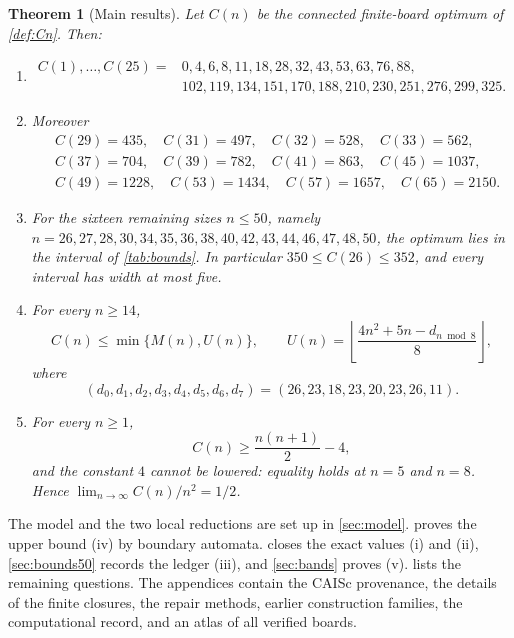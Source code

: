 \documentclass[10pt]{article}
\newtheorem{theorem}{Theorem}[section]
\theoremstyle{remark}
\begin{document}
\begin{theorem}[Main results]\label{thm:main}
Let $C(n)$ be the connected finite-board optimum of
\cref{def:Cn}.  Then:
\begin{enumerate}[label=\textup{(\roman*)}]
\item
\[
\begin{aligned}
C(1),\ldots,C(25)={}&0,4,6,8,11,18,28,32,43,53,63,76,88,\\
&102,119,134,151,170,188,210,230,251,276,299,325.
\end{aligned}
\]
\item Moreover
\[
\begin{aligned}
&C(29)=435,\quad C(31)=497,\quad C(32)=528,\quad C(33)=562,\\
&C(37)=704,\quad C(39)=782,\quad C(41)=863,\quad C(45)=1037,\\
&C(49)=1228,\quad C(53)=1434,\quad C(57)=1657,\quad C(65)=2150.
\end{aligned}
\]
\item For the sixteen remaining sizes $n\le50$, namely
$n=26,27,28,30,34,35,36,38,40,42,43,44,46,47,48,50$, the optimum lies in the
interval of \cref{tab:bounds}.  In particular $350\le C(26)\le352$, and every
interval has width at most five.
\item For every $n\ge14$,
\begin{equation}\label{eq:main-upper}
C(n)\le \min\{M(n),U(n)\},\qquad
U(n)=\left\lfloor\frac{4n^2+5n-d_{n\bmod8}}8\right\rfloor,
\end{equation}
where
\begin{equation}\label{eq:d-vector}
(d_0,d_1,d_2,d_3,d_4,d_5,d_6,d_7)
=(26,23,18,23,20,23,26,11).
\end{equation}
\item For every $n\ge1$,
\begin{equation}\label{eq:main-lower}
C(n)\ge\frac{n(n+1)}2-4,
\end{equation}
and the constant $4$ cannot be lowered: equality holds at $n=5$ and $n=8$.
Hence $\lim_{n\to\infty}C(n)/n^2=1/2$.
\end{enumerate}
\end{theorem}

The model and the two local reductions are set up in \cref{sec:model}.
 proves the upper bound (iv) by boundary automata.
 closes the exact values (i) and (ii), \cref{sec:bounds50}
records the ledger (iii), and \cref{sec:bands} proves (v).  
lists the remaining questions.  The appendices contain the CAISc provenance,
the details of the finite closures, the repair methods, earlier construction
families, the computational record, and an atlas of all verified boards.
\end{document}
